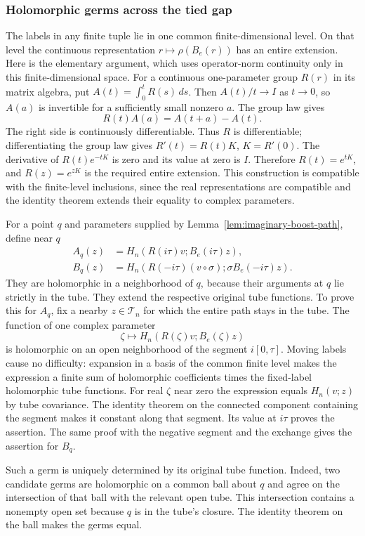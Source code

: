 \subsubsection{Holomorphic germs across the tied gap}
The labels in any finite tuple lie in one common finite-dimensional level.
On that level the continuous representation $r\mapsto\rho(B_e(r))$
has an entire extension. Here is the elementary argument, which uses
operator-norm continuity only in this finite-dimensional space.
For a continuous one-parameter group $R(r)$ in its matrix algebra, put
$A(t)=\int_0^tR(s)\,ds$. Then $A(t)/t\to I$ as $t\to0$, so $A(a)$
is invertible for a sufficiently small nonzero $a$. The group law gives
\[
 R(t)A(a)=A(t+a)-A(t).
\]
The right side is continuously differentiable. Thus $R$ is differentiable;
differentiating the group law gives $R'(t)=R(t)K$, $K=R'(0)$.
The derivative of $R(t)e^{-tK}$ is zero and its value at zero is $I$.
Therefore $R(t)=e^{tK}$, and $R(z)=e^{zK}$ is the required entire extension.
This construction is compatible with the finite-level inclusions, since
the real representations are compatible and the identity theorem extends
their equality to complex parameters.

For a point $q$ and parameters supplied by
Lemma~\ref{lem:imaginary-boost-path}, define near $q$
\begin{align*}
 A_q(z)&=H_n(R(i\tau)v;B_e(i\tau)z),\\
 B_q(z)&=H_n(R(-i\tau)(v\circ\sigma);\sigma B_e(-i\tau)z).
\end{align*}
They are holomorphic in a neighborhood of $q$, because their arguments
at $q$ lie strictly in the tube. They extend the respective original
tube functions. To prove this for $A_q$, fix a nearby
$z\in\mathcal T_n$ for which the entire path stays in the tube.
The function of one complex parameter
\[
 \zeta\longmapsto H_n(R(\zeta)v;B_e(\zeta)z)
\]
is holomorphic on an open neighborhood of the segment $i[0,\tau]$.
Moving labels cause no difficulty: expansion in a basis of the common
finite level makes the expression a finite sum of holomorphic coefficients
times the fixed-label holomorphic tube functions. For real $\zeta$ near
zero the expression equals $H_n(v;z)$ by tube covariance. The identity
theorem on the connected component containing the segment makes it constant
along that segment. Its value at $i\tau$ proves the assertion.
The same proof with the negative segment and the exchange gives the
assertion for $B_q$.

Such a germ is uniquely determined by its original tube function. Indeed,
two candidate germs are holomorphic on a common ball about $q$ and agree
on the intersection of that ball with the relevant open tube. This
intersection contains a nonempty open set because $q$ is in the tube's
closure. The identity theorem on the ball makes the germs equal.

